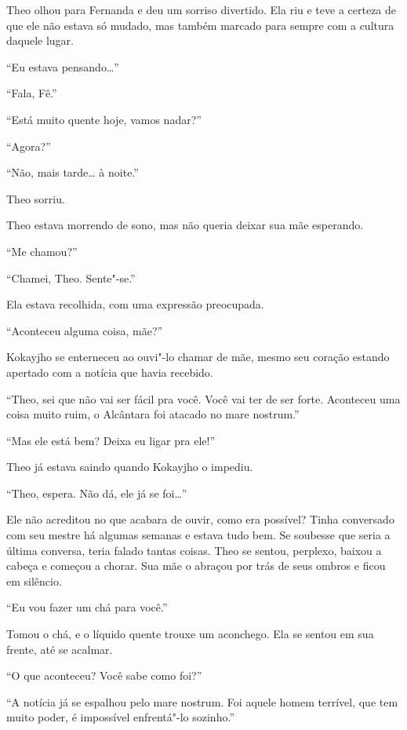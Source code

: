 Theo olhou para Fernanda e deu um sorriso divertido. Ela riu e teve a
certeza de que ele não estava só mudado, mas também marcado para sempre
com a cultura daquele lugar.

``Eu estava pensando\ldots{}''

``Fala, Fê.''

``Está muito quente hoje, vamos nadar?''

``Agora?''

``Não, mais tarde\ldots{} à noite.''

Theo sorriu.

\asterisc


Theo estava morrendo de sono, mas não queria deixar sua mãe esperando.

``Me chamou?''

``Chamei, Theo. Sente"-se.''

Ela estava recolhida, com uma expressão preocupada.

``Aconteceu alguma coisa, mãe?''

Kokayjho se enterneceu ao ouvi"-lo chamar de mãe, mesmo seu
coração estando apertado com a notícia que havia recebido.

``Theo, sei que não vai ser fácil pra você. Você vai ter de ser forte.
Aconteceu uma coisa muito ruim, o Alcântara foi atacado no mare
nostrum.''

``Mas ele está bem? Deixa eu ligar pra ele!''

Theo já estava saindo quando Kokayjho o impediu.

``Theo, espera. Não dá, ele já se foi\ldots{}''

Ele não acreditou no que acabara de ouvir, como era possível? Tinha
conversado com seu mestre há algumas semanas e estava tudo bem. Se
soubesse que seria a última conversa, teria falado tantas coisas.
Theo se sentou, perplexo, baixou a cabeça e começou a chorar. Sua mãe o
abraçou por trás de seus ombros e ficou em silêncio.

``Eu vou fazer um chá para você.''

Tomou o chá, e o líquido quente trouxe um aconchego. Ela se sentou
em sua frente, até se acalmar.

``O que aconteceu? Você sabe como foi?''

``A notícia já se espalhou pelo mare nostrum. Foi aquele homem terrível,
que tem muito poder, é impossível enfrentá"-lo sozinho.''

